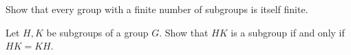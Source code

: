 \documentclass{problemset}
\begin{document}
\begin{exercise}
Show that every group with a finite number of subgroups is itself finite.
\end{exercise}



\begin{exercise}
Let \(H,K\) be subgroups of a group \(G\). Show that \(HK\) is a subgroup if and only if \(HK=KH\).
\end{exercise}


\end{document}
